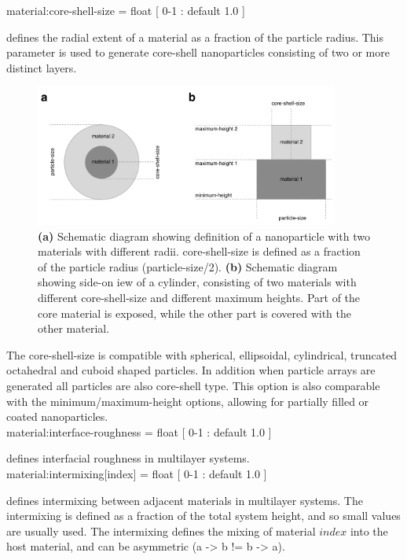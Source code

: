 {\zicf material:core-shell-size = float [ 0-1 : default 1.0 ]} defines the radial extent of a material as a fraction of the particle radius. This parameter is used to generate core-shell nanoparticles consisting of two or more distinct layers.
\begin{figure}[!htb]
\center
\includegraphics[width=10cm]{figures/core-shell.pdf}
\caption{\textbf{(a)} Schematic diagram showing definition of a nanoparticle with two materials with different radii. core-shell-size is defined as a fraction of the particle radius (particle-size/2). \textbf{(b)} Schematic diagram showing side-on iew of a cylinder, consisting of two materials with different core-shell-size and different maximum heights. Part of the core material is exposed, while the other part is covered with the other material.} 
\label{fig:multilayer}
\end{figure}
The core-shell-size is compatible with spherical, ellipsoidal, cylindrical, truncated octahedral and cuboid shaped particles. In addition when particle arrays are generated all particles are also core-shell type. This option is also comparable with the minimum/maximum-height options, allowing for partially filled or coated nanoparticles.\\

{\zicf material:interface-roughness = float [ 0-1 : default 1.0 ]} defines interfacial roughness in multilayer systems.\\

{\zicf material:intermixing[index] = float [ 0-1 : default 1.0 ]} defines intermixing between adjacent materials in multilayer systems. The intermixing is defined as a fraction of the total system height, and so small values are usually used. The intermixing defines the mixing of material $index$ into the host material, and can be asymmetric (a -> b != b -> a).\\

